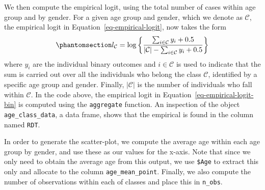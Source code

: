 \documentclass[
  letterpaper,
]{krantz}
\newenvironment{Shaded}{\begin{snugshade}}{\end{snugshade}}
\newcommand{\AttributeTok}[1]{\textcolor[rgb]{0.13,0.29,0.53}{#1}}
\newcommand{\CommentTok}[1]{\textcolor[rgb]{0.56,0.35,0.01}{\textit{#1}}}
\newcommand{\FunctionTok}[1]{\textcolor[rgb]{0.13,0.29,0.53}{\textbf{#1}}}
\newcommand{\NormalTok}[1]{#1}
\newcommand{\OtherTok}[1]{\textcolor[rgb]{0.56,0.35,0.01}{#1}}
\newcommand{\SpecialCharTok}[1]{\textcolor[rgb]{0.81,0.36,0.00}{\textbf{#1}}}
\begin{document}
We then compute the empirical logit, using the total number of cases
within age group and by gender. For a given age group and gender, which
we denote as \(\mathcal{C}\), the empirical logit in
Equation~\ref{eq-empirical-logit}, now takes the form
\begin{equation}\phantomsection\label{eq-empirical-logit-bin}{
l_{\mathcal{C}} = \log\left\{\frac{\sum_{i \in \mathcal{C}} y_{i} + 0.5}{|\mathcal{C}|- \sum_{i \in \mathcal{C}} y_{i} + 0.5} \right\}
}\end{equation} where \(y_i\) are the individual binary outcomes and
\(i\in \mathcal{C}\) is used to indicate that the sum is carried out
over all the individuals who belong the class \(\mathcal{C}\),
identified by a specific age group and gender. Finally,
\(|\mathcal{C}|\) is the number of individuals who fall within
\(\mathcal{C}\). In the code above, the empirical logit in
Equation~\ref{eq-empirical-logit-bin} is computed using the
\texttt{aggregate} function. An inspection of the object
\texttt{age\_class\_data}, a data frame, shows that the empirical is
found in the column named \texttt{RDT}.

\begin{Shaded}
\end{Shaded}

In order to generate the scatter-plot, we compute the average age within
each age group by gender, and use these as our values for the x-axis.
Note that since we only need to obtain the average age from this output,
we use \texttt{\$Age} to extract this only and allocate to the column
\texttt{age\_mean\_point}. Finally, we also compute the number of
observations within each of classes and place this in \texttt{n\_obs}.
\end{document}
